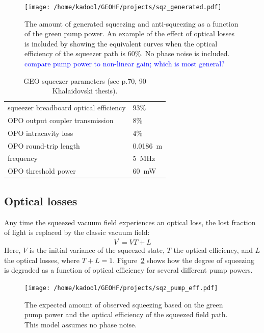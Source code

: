 \documentclass{ligodoc}
\begin{document}
\begin{figure}
\begin{centering}
\texttt{[image: /home/kadool/GEOHF/projects/sqz\_generated.pdf]}
\caption{The amount of generated squeezing and anti-squeezing as a
  function of the green pump power. An example of the effect of
  optical losses is included by showing the equivalent curves when the
  optical efficiency of the squeezer path is 60\%. No phase noise is
  included. \textcolor{blue}{compare pump power to non-linear gain;
    which is most general?}}
\label{fig:sqz_generated}
\end{centering}
\end{figure}

\begin{table}
\centering
\caption{GEO squeezer parameters (see p.70, 90 Khalaidovski thesis).}
\begin{tabular}{l l}
\hline
squeezer breadboard optical efficiency & 93\% \\
OPO output coupler transmission & 8\%\\
OPO intracavity loss & 4\%\\
OPO round-trip length & 0.0186~m\\
frequency & 5~MHz\\
OPO threshold power & 60~mW\\
\hline
\end{tabular}
\label{tab:GEOsqz_params}
\end{table}


\subsection{Optical losses}
Any time the squeezed vacuum field experiences an optical loss, the
lost fraction of light is replaced by the classic vacuum field:
\begin{equation}
V^\prime= VT + L
\end{equation}
Here, $V$ is the initial variance of the squeezed state, $T$ the optical
efficiency, and $L$ the optical losses, where
$T+L=1$. Figure~\ref{fig:sqzpumplosses} shows how the degree of
squeezing is degraded as a function of optical efficiency for several
different pump powers.

\begin{figure}
\begin{centering}
\texttt{[image: /home/kadool/GEOHF/projects/sqz\_pump\_eff.pdf]}
\caption{The expected amount of observed squeezing based on the green
  pump power and the optical efficiency of the squeezed field path. This
  model assumes no phase noise.}
\label{fig:sqzpumplosses}
\end{centering}
\end{figure}
\end{document}
